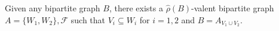 Given any bipartite graph $B$, there exists a $\hat{\rho}(B)$-valent bipartite graph $A = \{W_1, W_2\}, \mathcal{F}$ such that $V_i \subseteq W_i$ for $i = 1, 2$ and $B = A_{V_1 \cup V_2}$.
